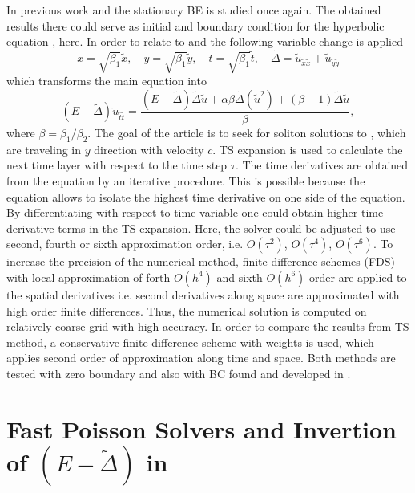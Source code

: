 \documentclass[11pt,a4paper,twoside]{article}
\begin{document}
In previous work \cite{EllipticProblem} and \cite{BoundaryProblem} the stationary BE is studied once again. The obtained results there could serve as initial and boundary condition for the hyperbolic equation ,   here. In order to relate to \cite{EllipticProblem} and \cite{BoundaryProblem}
the following variable change is applied
\begin{equation}\label{vc}
x = \sqrt{\beta_1} \tilde x, \quad y = \sqrt{\beta_1} \tilde y, \quad t = \sqrt{\beta_1} \tilde t, \quad \tilde \Delta = \tilde u_{\tilde x \tilde x} + \tilde u_{\tilde y \tilde y}
\end{equation}
which transforms the main equation   into 
\begin{equation}\label{eqVC}
(E-\tilde \Delta)  \tilde u_{\tilde t \tilde t} = \frac{(E-\tilde\Delta)\tilde\Delta \tilde u + \alpha \beta \tilde\Delta(\tilde u^2) + (\beta -1)\tilde\Delta \tilde u}{\beta},
\end{equation}
where $\beta = \beta_1 / \beta_2$. The goal of the article is to seek for soliton solutions to , which 
are traveling  in $y$ direction with velocity $c$. TS expansion is used to calculate the next time layer with respect to the time step $\tau$. The time derivatives
are obtained from the equation  by an iterative procedure. This is possible because the equation allows to isolate the highest time derivative on one side of the equation. By differentiating with respect to time variable one could obtain higher time derivative terms in the TS expansion. Here, the solver could be adjusted to use second, fourth or sixth approximation order, i.e. $O(\tau^2)$, $O(\tau^4)$, $O(\tau^6)$. To increase the precision of the numerical method, finite difference schemes (FDS) with local approximation of forth $O(h^4)$ and sixth $O(h^6)$ order are applied to the spatial derivatives i.e.  second derivatives along space are approximated with high order finite differences. Thus, the numerical solution is computed on relatively coarse grid with high accuracy. In order to compare the results from TS method, a conservative finite difference scheme with weights is used, which applies second order of approximation along time and space.
Both methods are tested with zero boundary and also with BC found and developed in \cite{BoundaryProblem}.

\section{Fast Poisson Solvers and Invertion of $(E-\tilde \Delta)$ in }
\end{document}
